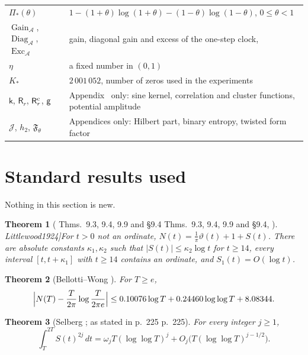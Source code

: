 \documentclass[11pt,reqno]{amsart}
\makeatletter
\let\CG@origref\ref
\let\CG@origeqref\eqref
\newcommand{\CG@gettip}[1]{\@ifundefined{CGTip@#1}{Reference: #1}{\csname CGTip@#1\endcsname}}
\DeclareRobustCommand{\CGref}[1]{\pdftooltip{\CG@origref{#1}}{\CG@gettip{#1}}}
\DeclareRobustCommand{\CGeqref}[1]{\pdftooltip{\CG@origeqref{#1}}{\CG@gettip{#1}}}
\let\CG@origcite\cite
\renewcommand*{\cite}[2][]{\def\CG@citekey{#2}%
  \ifx\relax#1\relax\CG@origcite{#2}\else\CG@origcite[#1]{#2}\fi}
\numberwithin{equation}{section}
\theoremstyle{plain}
\newtheorem{theorem}{Theorem}[section]
\theoremstyle{definition}
\theoremstyle{remark}
\newcommand{\Gain}{\operatorname{Gain}}
\newcommand{\Diag}{\operatorname{Diag}}
\newcommand{\Exc}{\operatorname{Exc}}
\newcommand{\sk}{\mathsf k}
\makeatother
\begin{document}
\begin{center}
\begin{longtable}{p{}p{}}
$\Pi_*(\theta)$ & $1-(1+\theta)\log(1+\theta)-(1-\theta)\log(1-\theta)$, $0\le\theta<1$\\
$\Gain_{\mathcal A}$, $\Diag_{\mathcal A}$, $\Exc_{\mathcal A}$ & gain, diagonal gain and excess of the one-step clock, \CGeqref{eq:accounting_def}\\
$\eta$ & a fixed number in $(0,1)$\\
$K_*$ & $2\,001\,052$, number of zeros used in the experiments\\
$\sk$, $\mathsf R_r$, $\mathsf R^{\rm c}_r$, $\mathsf g$ & Appendix~\CGref{sec:appendix_model} only: sine kernel, correlation and cluster functions, potential amplitude\\
$\mathcal J$, $h_2$, $\mathfrak F_\theta$ & Appendices only: Hilbert part, binary entropy, twisted form factor\\
\bottomrule
\end{longtable}
\end{center}

\section{Standard results used}
\label{sec:known_results}

Nothing in this section is new.

\begin{theorem}[{\cite[Thms.~9.3, 9.4, 9.9 and \S9.4]{Titchmarsh1986}}, \cite{Littlewood1924}]\label{thm:known_basic}
For $t>0$ not an ordinate, $N(t)=\frac1\pi\vartheta(t)+1+S(t)$. There are absolute constants $\kappa_1,\kappa_2$ such that $|S(t)|\le\kappa_2\log t$ for $t\ge14$, every interval $[t,t+\kappa_1]$ with $t\ge14$ contains an ordinate, and $S_1(t)=O(\log t)$.
\end{theorem}

\begin{theorem}[Bellotti--Wong {\cite{BellottiWong2025}}]\label{thm:known_BW}
For $T\ge e$,
\begin{equation}
\Bigl|N(T)-\frac T{2\pi}\log\frac T{2\pi e}\Bigr|\le0.10076\log T+0.24460\log\log T+8.08344 .
\label{eq:BW_bound}
\end{equation}
\end{theorem}

\begin{theorem}[Selberg {\cite{Selberg1946a}}; as stated in {\cite[p.~225]{Fujii1974}}]\label{thm:known_selberg_moments}
For every integer $j\ge1$,
\begin{equation}
\int_T^{2T}S(t)^{2j}\,dt=\omega_jT(\log\log T)^j+O_j\bigl(T(\log\log T)^{j-1/2}\bigr).
\label{eq:selberg_moments}
\end{equation}
\end{theorem}
\end{document}
